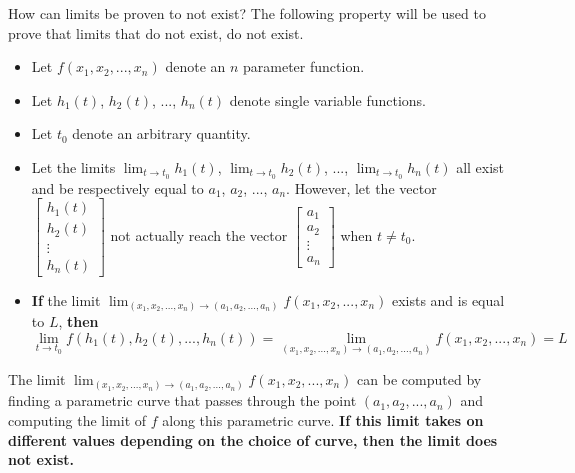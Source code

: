 \documentclass{article}
\begin{document}
\vspace{5mm}
  
How can limits be proven to not exist? The following property will be used to prove that limits that do not exist, do not exist.
\begin{itemize}
\item Let \(f(x_1, x_2, ..., x_n)\) denote an \(n\) parameter function. 
\item Let \(h_1(t)\), \(h_2(t)\), ..., \(h_n(t)\) denote single variable functions. 
\item Let \(t_0\) denote an arbitrary quantity. 
\item Let the limits \(\lim_{t \rightarrow t_0} h_1(t)\), \(\lim_{t \rightarrow t_0} h_2(t)\), ..., \(\lim_{t \rightarrow t_0} h_n(t)\) all exist and be respectively equal to \(a_1\), \(a_2\), ..., \(a_n\). However, let the vector \(\begin{bmatrix} h_1(t) \\ h_2(t) \\ \vdots \\ h_n(t) \end{bmatrix}\) not actually reach the vector \(\begin{bmatrix} a_1 \\ a_2 \\ \vdots \\ a_n \end{bmatrix}\) when \(t \neq t_0\). 
\item {\bf If} the limit \(\lim_{(x_1, x_2, ..., x_n) \rightarrow (a_1, a_2, ..., a_n)} f(x_1, x_2, ..., x_n)\) exists and is equal to \(L\), {\bf then}
\[\lim_{t \rightarrow t_0} f(h_1(t), h_2(t), ..., h_n(t)) = \lim_{(x_1, x_2, ..., x_n) \rightarrow (a_1, a_2, ..., a_n)} f(x_1, x_2, ..., x_n) = L\] 
\end{itemize}

The limit \(\lim_{(x_1, x_2, ..., x_n) \rightarrow (a_1, a_2, ..., a_n)} f(x_1, x_2, ..., x_n)\) can be computed by finding a parametric curve that passes through the point \((a_1, a_2, ..., a_n)\) and computing the limit of \(f\) along this parametric curve. {\bf If this limit takes on different values depending on the choice of curve, then the limit does not exist.}

\vspace{5mm}
\end{document}
